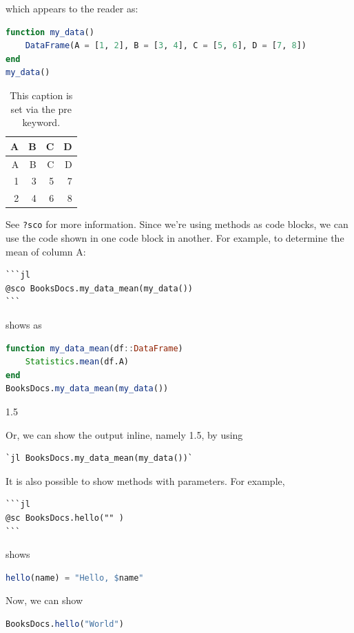 \documentclass[
  notoc %
]{tufte-book}
\newcommand{\passthrough}[1]{#1}
\begin{document}
which appears to the reader as:

\begin{lstlisting}[language=Julia]
function my_data()
    DataFrame(A = [1, 2], B = [3, 4], C = [5, 6], D = [7, 8])
end
my_data()
\end{lstlisting}

\begin{longtable}[]{@{}rrrr@{}}
\caption{This caption is set via the pre keyword.}\tabularnewline
\toprule
A & B & C & D \\
\midrule
\endfirsthead
\toprule
A & B & C & D \\
\midrule
\endhead
1 & 3 & 5 & 7 \\
2 & 4 & 6 & 8 \\
\bottomrule
\end{longtable}

See \passthrough{\lstinline!?sco!} for more information. Since we're
using methods as code blocks, we can use the code shown in one code
block in another. For example, to determine the mean of column A:

\begin{lstlisting}
```jl
@sco BooksDocs.my_data_mean(my_data())
```
\end{lstlisting}

shows as

\begin{lstlisting}[language=Julia]
function my_data_mean(df::DataFrame)
    Statistics.mean(df.A)
end
BooksDocs.my_data_mean(my_data())
\end{lstlisting}

1.5

Or, we can show the output inline, namely 1.5, by using

\begin{lstlisting}
`jl BooksDocs.my_data_mean(my_data())`
\end{lstlisting}

It is also possible to show methods with parameters. For example,

\begin{lstlisting}
```jl
@sc BooksDocs.hello("" )
```
\end{lstlisting}

shows

\begin{lstlisting}[language=Julia]
hello(name) = "Hello, $name"
\end{lstlisting}

Now, we can show

\begin{lstlisting}[language=Julia]
BooksDocs.hello("World")
\end{lstlisting}
\end{document}
